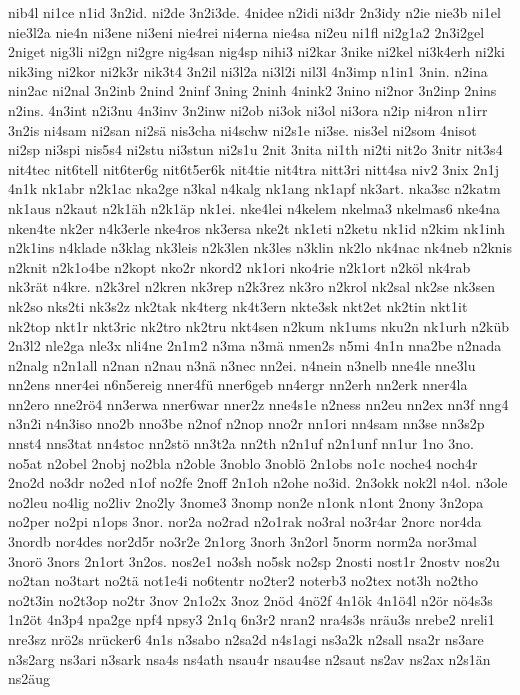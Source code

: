 {nib4l
ni1ce
n1id
3n2id.
ni2de
3n2i3de.
4nidee
n2idi
ni3dr
2n3idy
n2ie
nie3b
ni1el
nie3l2a
nie4n
ni3ene
ni3eni
nie4rei
ni4erna
nie4sa
ni2eu
ni1fl
ni2g1a2
2n3i2gel
2niget
nig3li
ni2gn
ni2gre
nig4san
nig4sp
nihi3
ni2kar
3nike
ni2kel
ni3k4erh
ni2ki
nik3ing
ni2kor
ni2k3r
nik3t4
3n2il
ni3l2a
ni3l2i
nil3l
4n3imp
n1in1
3nin.
n2ina
nin2ac
ni2nal
3n2inb
2nind
2ninf
3ning
2ninh
4nink2
3nino
ni2nor
3n2inp
2nins
n2ins.
4n3int
n2i3nu
4n3inv
3n2inw
ni2ob
ni3ok
ni3ol
ni3ora
n2ip
ni4ron
n1irr
3n2is
ni4sam
ni2san
ni2sä
nis3cha
ni4schw
ni2s1e
ni3se.
nis3el
ni2som
4nisot
ni2sp
ni3spi
nis5s4
ni2stu
ni3stun
ni2s1u
2nit
3nita
ni1th
ni2ti
nit2o
3nitr
nit3s4
nit4tec
nit6tell
nit6ter6g
nit6t5er6k
nit4tie
nit4tra
nitt3ri
nitt4sa
niv2
3nix
2n1j
4n1k
nk1abr
n2k1ac
nka2ge
n3kal
n4kalg
nk1ang
nk1apf
nk3art.
nka3sc
n2katm
nk1aus
n2kaut
n2k1äh
n2k1äp
nk1ei.
nke4lei
n4kelem
nkelma3
nkelmas6
nke4na
nken4te
nk2er
n4k3erle
nke4ros
nk3ersa
nke2t
nk1eti
n2ketu
nk1id
n2kim
nk1inh
n2k1ins
n4klade
n3klag
nk3leis
n2k3len
nk3les
n3klin
nk2lo
nk4nac
nk4neb
n2knis
n2knit
n2k1o4be
n2kopt
nko2r
nkord2
nk1ori
nko4rie
n2k1ort
n2köl
nk4rab
nk3rät
n4kre.
n2k3rel
n2kren
nk3rep
n2k3rez
nk3ro
n2krol
nk2sal
nk2se
nk3sen
nk2so
nks2ti
nk3s2z
nk2tak
nk4terg
nk4t3ern
nkte3sk
nkt2et
nk2tin
nkt1it
nk2top
nkt1r
nkt3ric
nk2tro
nk2tru
nkt4sen
n2kum
nk1ums
nku2n
nk1urh
n2küb
2n3l2
nle2ga
nle3x
nli4ne
2n1m2
n3ma
n3mä
nmen2s
n5mi
4n1n
nna2be
n2nada
n2nalg
n2n1all
n2nan
n2nau
n3nä
n3nec
nn2ei.
n4nein
n3nelb
nne4le
nne3lu
nn2ens
nner4ei
n6n5ereig
nner4fü
nner6geb
nn4ergr
nn2erh
nn2erk
nner4la
nn2ero
nne2rö4
nn3erwa
nner6war
nner2z
nne4s1e
n2ness
nn2eu
nn2ex
nn3f
nng4
n3n2i
n4n3iso
nno2b
nno3be
n2nof
n2nop
nno2r
nn1ori
nn4sam
nn3se
nn3s2p
nnst4
nns3tat
nn4stoc
nn2stö
nn3t2a
nn2th
n2n1uf
n2n1unf
nn1ur
1no
3no.
no5at
n2obel
2nobj
no2bla
n2oble
3noblo
3noblö
2n1obs
no1c
noche4
noch4r
2no2d
no3dr
no2ed
n1of
no2fe
2noff
2n1oh
n2ohe
no3id.
2n3okk
nok2l
n4ol.
n3ole
no2leu
no4lig
no2liv
2no2ly
3nome3
3nomp
non2e
n1onk
n1ont
2nony
3n2opa
no2per
no2pi
n1ops
3nor.
nor2a
no2rad
n2o1rak
no3ral
no3r4ar
2norc
nor4da
3nordb
nor4des
nor2d5r
no3r2e
2n1org
3norh
3n2orl
5norm
norm2a
nor3mal
3norö
3nors
2n1ort
3n2os.
nos2e1
no3sh
no5sk
no2sp
2nosti
nost1r
2nostv
nos2u
no2tan
no3tart
no2tä
not1e4i
no6tentr
no2ter2
noterb3
no2tex
not3h
no2tho
no2t3in
no2t3op
no2tr
3nov
2n1o2x
3noz
2nöd
4nö2f
4n1ök
4n1ö4l
n2ör
nö4s3s
1n2öt
4n3p4
npa2ge
npf4
npsy3
2n1q
6n3r2
nran2
nra4s3s
nräu3s
nrebe2
nreli1
nre3sz
nrö2s
nrücker6
4n1s
n3sabo
n2sa2d
n4s1agi
ns3a2k
n2sall
nsa2r
ns3are
n3s2arg
ns3ari
n3sark
nsa4s
ns4ath
nsau4r
nsau4se
n2saut
ns2av
ns2ax
n2s1än
ns2äug
}
